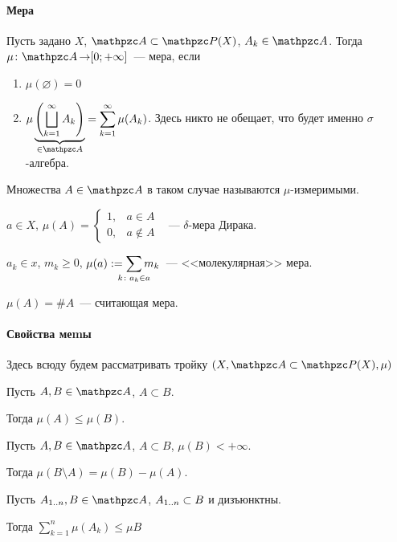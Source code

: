 \documentclass[12pt, timbord]{longnotes}
\begin{document}
\paragraph{Мера}
\label{par:meas::meas}

\begin{defn}\label{defn:meas::meas}
  Пусть задано $X$, $\alg \subset \pset (X)$, $A_k \in \alg$. Тогда $\mu \colon \alg \to [0;
  +\infty]$~--- мера, если 
  \begin{enumerate}
    \item $\mu(\varnothing) = 0$
    \item $\displaystyle\mu\underbrace{\left(\bigsqcup_{k=1}^\infty A_k\right)}_{\in \alg} 
      = \sum_{k=1}^\infty \mu(A_k)$. Здесь никто не обещает, что будет именно $\sigma$-алгебра.
  \end{enumerate}
  Множества $A \in \alg$ в таком случае называются $\mu$-измеримыми.
\end{defn}

\begin{exmp}\label{exmp:meas::meas::delta}
  $a \in X$, $\displaystyle\mu(A) = \begin{cases}
    1, & a\in A \\
    0, & a \not\in A
  \end{cases}$ ~--- $\delta$-мера Дирака.
\end{exmp}
\begin{exmp}\label{exmp:meas::meas::mol}
  $a_k \in x$, $m_k \geqslant 0$, $\displaystyle\mu(a) := \sum_{\mathclap {k\colon a_k \in a}} m_k$~---
  <<молекулярная>> мера.
\end{exmp}

\begin{exmp}\label{exmp:meas::meas::cnt}
  $\mu(A) = \# A$~--- считающая мера. 
\end{exmp}

\paragraph{Свойства меmы}

Здесь всюду будем рассматривать тройку $(X, \alg \subset \pset (X), \mu)$

\begin{prop}\label{prop:meas::meas::monot}
  Пусть $A,B \in \alg$, $A \subset B$. \par Тогда $\mu(A) \leqslant \mu(B)$.
\end{prop}
\begin{prop}\label{prop:meas::meas::diff}
  Пусть $A,B \in \alg$, $A \subset B$, $\mu(B) < +\infty$.  \par 
  Тогда $ \mu(B\setminus A) = \mu(B) - \mu(A)$.
\end{prop}
\begin{prop}\label{prop:meas::meas::enfmont}
  Пусть $A_{1 \intrng n}, B \in \alg$, $A_{1 \mathbin{..} n} \subset B$ и дизъюнктны. \par
  Тогда $\displaystyle\sum_{k=1}^n \mu(A_k) \leqslant \mu B$
\end{prop}
\end{document}
